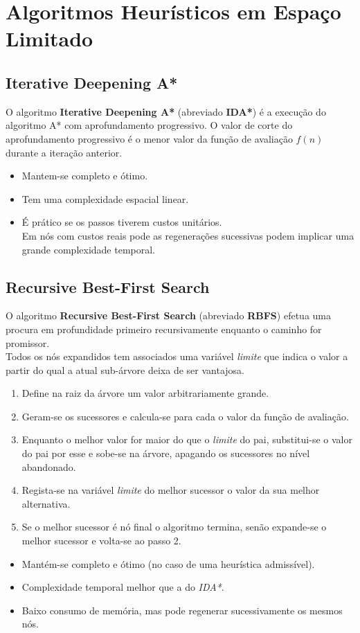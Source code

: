\documentclass[]{report}
\begin{document}
\section{Algoritmos Heurísticos em Espaço Limitado}
\subsection{Iterative Deepening A*}
O algoritmo \textbf{Iterative Deepening A*} (abreviado \textbf{IDA*}) é a execução do algoritmo A* com aprofundamento progressivo.
O valor de corte do aprofundamento progressivo é o menor valor da função de avaliação $f(n)$ durante a iteração anterior.
\begin{itemize}
	\item Mantem-se completo e ótimo.
	\item Tem uma complexidade espacial linear.
	\item É prático se os passos tiverem custos unitários.\\
	Em nós com custos reais pode as regenerações sucessivas podem implicar uma grande complexidade temporal.
\end{itemize}
\subsection{Recursive Best-First Search}
O algoritmo \textbf{Recursive Best-First Search} (abreviado \textbf{RBFS}) efetua uma procura em profundidade primeiro recursivamente enquanto o caminho for promissor.\\
Todos os nós expandidos tem associados uma variável \textit{limite} que indica o valor a partir do qual a atual sub-árvore deixa de ser vantajosa.
\begin{enumerate}
	\item Define na raiz da árvore um valor arbitrariamente grande.
	\item Geram-se os sucessores e calcula-se para cada o valor da função de avaliação.
	\item Enquanto o melhor valor for maior do que o \textit{limite} do pai, substitui-se o valor do pai por esse e sobe-se na árvore, apagando os sucessores no nível abandonado.
	\item Regista-se na variável \textit{limite} do melhor sucessor o valor da sua melhor alternativa.
	\item Se o melhor sucessor é nó final o algoritmo termina, senão expande-se o melhor sucessor e volta-se ao passo 2.
\end{enumerate}
\begin{itemize}
	\item Mantém-se completo e ótimo (no caso de uma heurística admissível).
	\item Complexidade temporal melhor que a do \textit{IDA*}.
	\item Baixo consumo de memória, mas pode regenerar sucessivamente os mesmos nós.
\end{itemize}
\end{document}
